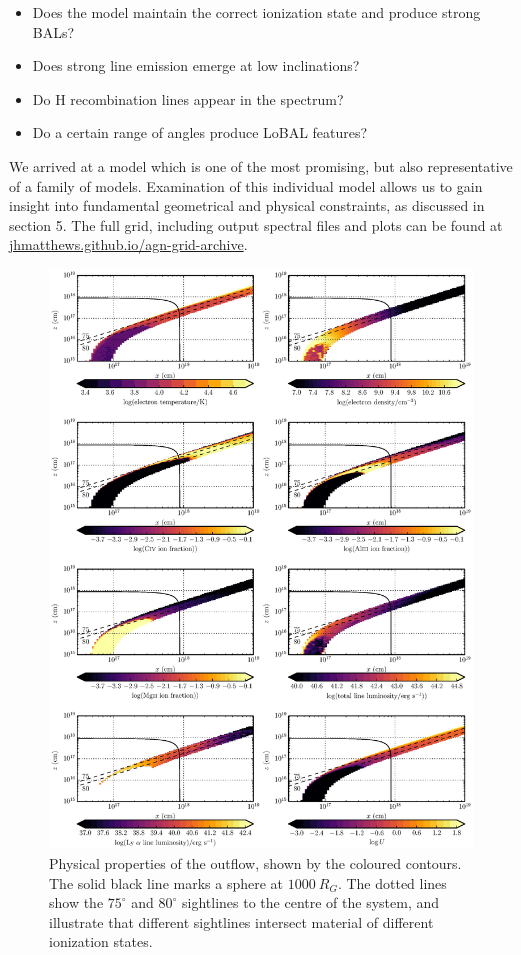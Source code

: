 \documentclass[preprint, a4paper, 11pt]{aastex}
\begin{document}
\begin{itemize}
\item Does the model maintain the correct ionization state and produce strong BALs?
\item Does strong line emission emerge at low inclinations?
\item Do H recombination lines appear in the spectrum?
\item Do a certain range of angles produce LoBAL features?
\end{itemize}

We arrived at a model which is one of the most promising,
but also representative of a family of models. Examination 
of this individual model allows us to gain insight
into fundamental geometrical and physical constraints, 
as discussed in section 5. 
The full grid, including output spectral files and plots can be found at
\url{jhmatthews.github.io/agn-grid-archive}.


\begin{figure} %
\centering
\includegraphics[width=1.0\textwidth]{figures/wind.eps}
\caption
{
Physical properties of the outflow, shown by the coloured contours.
The solid black line marks a sphere at $1000~R_G$.
The dotted lines show the $75^\circ$ and $80^\circ$ sightlines 
to the centre of the system, and illustrate that different sightlines
intersect material of different ionization states.
}
\label{fig:uvspec}
\end{figure} %
\end{document}
